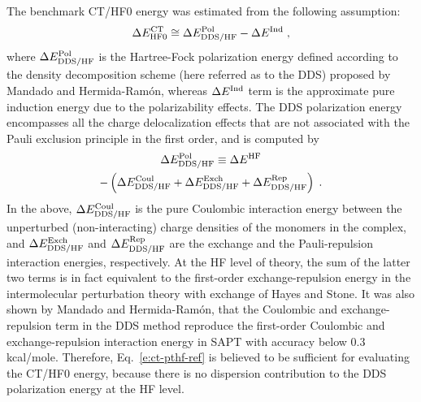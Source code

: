 The benchmark CT/HF0 energy was estimated
from the following assumption:
%
\begin{equation}\label{e:ct-pthf-ref}
 \Delta E^{\rm CT}_{\rm HF0} \cong \Delta E^{\rm Pol}_{\rm DDS/HF} 
 - \Delta E^{\rm Ind} \;,
\end{equation}
%
where $\Delta E^{\rm Pol}_{\rm DDS/HF}$ is the Hartree\hyp{}Fock polarization energy
defined
according to the density decomposition scheme (here referred as to the DDS) 
proposed by Mandado and Hermida\hyp{}Ram{\'o}n,\cite{Mandado.Hermida-Ramon.JCTC.2011} 
whereas $\Delta E^{\rm Ind}$ term is the 
approximate pure induction energy due to the polarizability effects.\cite{Stone.TheTheoryOfIntermolecularForces.1996}
The DDS polarization energy encompasses all the charge delocalization
effects that are not associated with the Pauli exclusion principle
in the first order, and is computed by
%
\begin{multline}\label{e:de-pol-dds}
\Delta E^{\rm Pol}_{\rm DDS/HF} \equiv \Delta E^{\rm HF} \\
 - \left(
   \Delta E^{\rm Coul}_{\rm DDS/HF}
 + \Delta E^{\rm Exch}_{\rm DDS/HF}
 + \Delta E^{\rm Rep}_{\rm DDS/HF} 
   \right)\;.
\end{multline}
%
In the above, $\Delta E^{\rm Coul}_{\rm DDS/HF}$ is the pure Coulombic interaction energy
between the unperturbed (non\hyp{}interacting) charge densities of the monomers in the complex,
and
$\Delta E^{\rm Exch}_{\rm DDS/HF}$ and $\Delta E^{\rm Rep}_{\rm DDS/HF}$
are the exchange and the Pauli\hyp{}repulsion interaction energies, respectively. 
At the HF level of theory, the sum of the latter two terms is in fact
equivalent to the first\hyp{}order exchange\hyp{}repulsion energy 
in the intermolecular perturbation theory with exchange of Hayes and Stone.\cite{Hayes.Stone.MolPhys.1984} 
It was also shown by 
Mandado and Hermida\hyp{}Ram{\'o}n,\cite{Mandado.Hermida-Ramon.JCTC.2011}
that the Coulombic and exchange\hyp{}repulsion term
in the DDS method reproduce the first\hyp{}order Coulombic and exchange\hyp{}repulsion
interaction energy in SAPT\cite{Jeziorski.Moszynski.Szalewicz.ChemRev.1994}
with accuracy below 0.3 kcal/mole.
Therefore, Eq.~\eqref{e:ct-pthf-ref} is believed to be sufficient
for evaluating the CT/HF0 energy, because there is no dispersion
contribution to the DDS polarization energy at the HF level.

